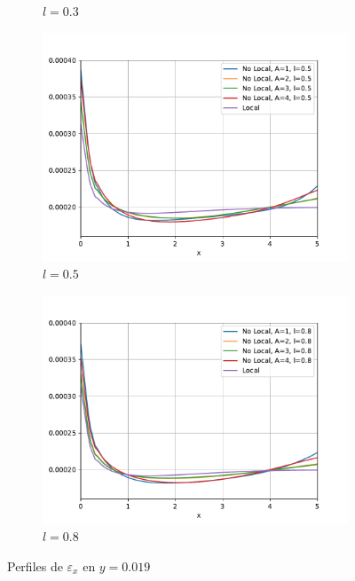 \begin{figure}
\begin{subfigure}{0.48\textwidth}
		        \caption{$l=0.3$}
		        \label{fig:perfilesY0019.03}
		    \end{subfigure}
		    \quad
		    \begin{subfigure}{0.48\textwidth}
		    \centering
		        \includegraphics[width=\textwidth]{figuras/Placa/Perfiles/Y/Y0.5_0.019.pdf}
		        \caption{$l=0.5$}
		        \label{fig:perfilesY0019.05}
		    \end{subfigure}
		    \begin{subfigure}{0.48\textwidth}
		    \centering
		        \includegraphics[width=\textwidth]{figuras/Placa/Perfiles/Y/Y0.8_0.019.pdf}
		        \caption{$l=0.8$}
		        \label{fig:perfilesY0019.08}
		    \end{subfigure}
		    \caption{Perfiles de $\varepsilon_x$ en $y=0.019$}
		    \label{fig:perfilesY0019}
		\end{figure}

